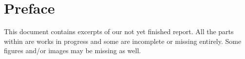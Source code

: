 \chapter{Preface}
\label{Preface}
This document contains excerpts of our not yet finished report. All the parts within are works in progress and some are incomplete or missing entirely. Some figures and/or images may be missing as well.